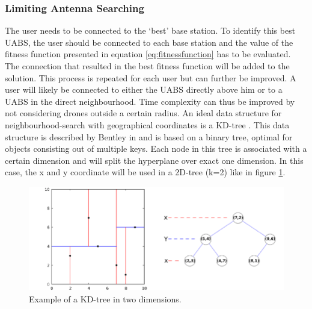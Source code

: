 \subsubsection{Limiting Antenna Searching}
The user needs to be connected to the `best' base station. To identify this best \gls{UABS}, the user should be connected 
to each base station and the value of the fitness function presented in equation \ref{eq:fitnessfunction} has to be evaluated. 
The connection that resulted in the best fitness function
will be added to the solution. This process is repeated for each user but can further be improved. 
A user will likely be connected to either the
\gls{UABS} directly above him or to a \gls{UABS} in the direct neighbourhood. 
Time complexity can thus be improved by not considering drones outside a certain radius.
An ideal data structure for neighbourhood-search with geographical coordinates is a KD-tree \cite{J27,J28}. 
This data structure  is described by Bentley in \cite{J29}  and is based on a binary tree, optimal for objects consisting out of 
multiple keys.
Each node in this tree is associated with a certain dimension and will split the hyperplane over exact one dimension.
In this case, the x and y coordinate will be used in a 2D-tree (k=2) like in figure \ref{fig:exampleKDtree}.

\begin{figure}[]
  \centering
  \includegraphics[width=\textwidth/10*8]{../images/Example-of-a-2D-k-d-tree.png}
  \caption{Example of a KD-tree in two dimensions.}
  \label{fig:exampleKDtree}
\end{figure}


